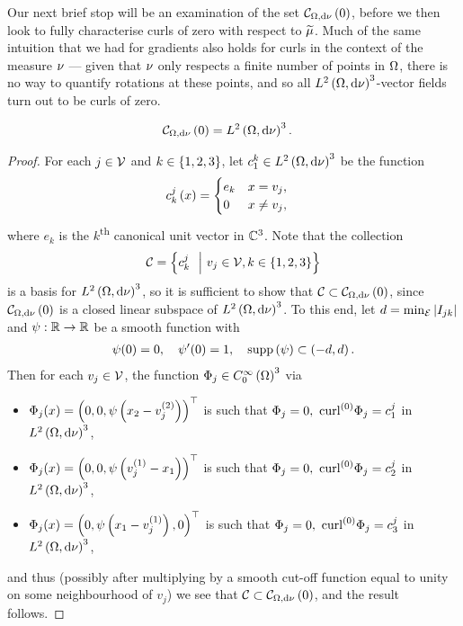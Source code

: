 Our next brief stop will be an examination of the set $\mathcal{C}_{ \Omega, \mathrm{d}\nu}\left( 0 \right)$, before we then look to fully characterise curls of zero with respect to $\widetilde{\mu}$.
Much of the same intuition that we had for gradients also holds for curls in the context of the measure $\nu$ --- given that $\nu$ only respects a finite number of points in $\Omega$, there is no way to quantify rotations at these points, and so all $L^{2}\left( \Omega,\mathrm{d} \nu \right)^3$-vector fields turn out to be curls of zero.
\begin{prop} \label{prop:VertexCurlZero}
	\begin{align*}
		\mathcal{C}_{ \Omega, \mathrm{d}\nu}\left( 0 \right) &= L^{2}\left( \Omega,\mathrm{d} \nu \right)^3.
	\end{align*}
\end{prop}
\begin{proof}
	For each $j\in\mathcal{V}$ and $k\in\left\{ 1,2,3 \right\}$, let $c^k_1\in L^{2}\left( \Omega,\mathrm{d} \nu \right)^3$ be the function
	\begin{align*}
		c^j_k\left( x \right) &= \begin{cases} e_k & x=v_j, \\ 0 & x\neq v_j, \end{cases}
	\end{align*}
	where $e_k$ is the $k$\textsuperscript{th} canonical unit vector in $\mathbb{C}^3$.
	Note that the collection 
	\begin{align*}
		\mathcal{C} = \left\{ c^j_k \ \ \middle\vert \  v_j\in\mathcal{V}, k\in\left\{ 1,2,3 \right\} \right\}
	\end{align*}
	is a basis for $L^{2}\left( \Omega,\mathrm{d} \nu \right)^3$, so it is sufficient to show that $\mathcal{C}\subset\mathcal{C}_{ \Omega, \mathrm{d}\nu}\left( 0 \right)$, since $\mathcal{C}_{ \Omega, \mathrm{d}\nu}\left( 0 \right)$ is a closed linear subspace of $L^{2}\left( \Omega,\mathrm{d} \nu \right)^3$.
	To this end, let $d=\min_{\mathcal{E}}\left\lvert I_{jk} \right\rvert$ and $\psi:\mathbb{R}\rightarrow\mathbb{R}$ be a smooth function with 
	\begin{align*}
		\psi(0) = 0, \quad \psi'(0) = 1, \quad \mathrm{supp}\left( \psi \right) \subset \left( -d,d \right).
	\end{align*}
	Then for each $v_j\in\mathcal{V}$, the function $\Phi_j\in C^{\infty}_{0}\left( \Omega \right)^3$ via 
	\begin{itemize}
		\item $\Phi_j(x) = \left( 0, 0, \psi\left( x_2 - v_j^{(2)} \right) \right)^\top$ is such that $\Phi_j = 0, \ \mathrm{curl}_{}^{(0)}\Phi_j = c^j_1$ in $L^{2}\left( \Omega,\mathrm{d} \nu \right)^3$,
		\item $\Phi_j(x) = \left( 0, 0, \psi\left( v_j^{(1)} - x_1 \right) \right)^\top$ is such that $\Phi_j = 0, \ \mathrm{curl}_{}^{(0)}\Phi_j = c^j_2$ in $L^{2}\left( \Omega,\mathrm{d} \nu \right)^3$,
		\item $\Phi_j(x) = \left( 0, \psi\left( x_1 - v_j^{(1)} \right), 0 \right)^\top$ is such that $\Phi_j = 0, \ \mathrm{curl}_{}^{(0)}\Phi_j = c^j_3$ in $L^{2}\left( \Omega,\mathrm{d} \nu \right)^3$,
	\end{itemize}
	and thus (possibly after multiplying by a smooth cut-off function equal to unity on some neighbourhood of $v_j$) we see that $\mathcal{C}\subset\mathcal{C}_{ \Omega, \mathrm{d}\nu}\left( 0 \right)$, and the result follows.
\end{proof}

